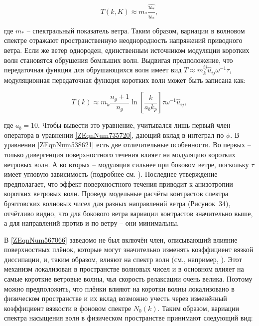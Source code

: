 \begin{equation} \label{1.41)} T\left(k,K\right)\approx m_{*} \frac{\widehat{u_{*} }}{u_{*} } ,  \end{equation} 



\noindent где $m_{*} $ -- спектральный показатель ветра. Таким образом, вариации в волновом спектре отражают пространственную неоднородность напряжений приводного ветра. Если же ветер однороден, единственным источником модуляции коротких волн становятся обрушения бомльших волн. Выдвигая предположение, что передаточная функция для обрушающихся волн имеет вид $T\approx m_{k}^{ij} \widehat{u}_{ij} \omega ^{-1} \tau $, модуляционная передаточная функция коротких волн может быть записана как:



\begin{equation} \label{1.42)} T\left(k\right)\approx m_{k} \frac{n_{g} +1}{n_{g} } \ln \left[\frac{k}{a_{b} k_{p} } \right]\tau \omega ^{-1} \widehat{u}_{ij} ,  \end{equation} 



\noindent где $a_{b} =10$. Чтобы вывести это уравнение, учитывался лишь первый член оператора в уравнении \eqref{ZEqnNum735720}, дающий вклад в интеграл по $\phi $. В уравнении \eqref{ZEqnNum538621} есть две отличительные особенности. Во первых -- только дивергенция поверхностного течения влияет на модуляцию коротких ветровых волн. А во вторых -- модуляция сильнее при боковом ветре, поскольку $\tau $ имеет угловую зависимость (подробнее см. \citep{Kudryavtsev2005}). Последнее утверждение предполагает, что эффект поверхностного течения приводит к анизотропии коротких ветровых волн. Проведя модельные расчёты контрастов спектра брэгговских волновых чисел для разных направлений ветра (Рисунок~34), отчётливо видно, что для бокового ветра вариации контрастов значительно выше, а для направлений против и по ветру -- они минимальны. 

В \eqref{ZEqnNum567066} заведомо не был включён член, описывающий влияние поверхностных плёнок, которые могут значительно изменять коэффициент вязкой диссипации, и, таким образом, влияют на спектр волн (см., например, \citep{Ermakov1992}). Этот механизм локализован в пространстве волновых чисел и в основном влияет на самые короткие ветровые волны, чья скорость релаксации очень велика. Поэтому можно предположить, что плёнки влияют на коротки волны локализовано в физическом пространстве и их вклад возможно учесть через изменённый коэффициент вязкости в фоновом спектре $N_{0} \left(k\right)$. Таким образом, вариации спектра насыщения волн в физическом пространстве принимают следующий вид:



